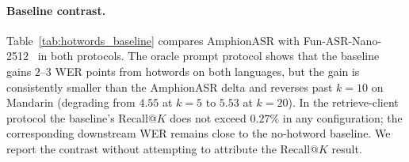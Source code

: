 \paragraph{Baseline contrast.}
Table~\ref{tab:hotwords_baseline} compares AmphionASR with
Fun-ASR-Nano-2512~\cite{funasrnano} in both protocols. The oracle
prompt protocol shows that the baseline gains $2$--$3$ WER points
from hotwords on both languages, but the gain is consistently
smaller than the AmphionASR delta and reverses past $k = 10$ on
Mandarin (degrading from $4.55$ at $k=5$ to $5.53$ at $k=20$). In
the retrieve-client protocol the baseline's Recall@$K$ does not
exceed $0.27\%$ in any configuration; the corresponding downstream
WER remains close to the no-hotword baseline. We report the
contrast without attempting to attribute the Recall@$K$ result.

